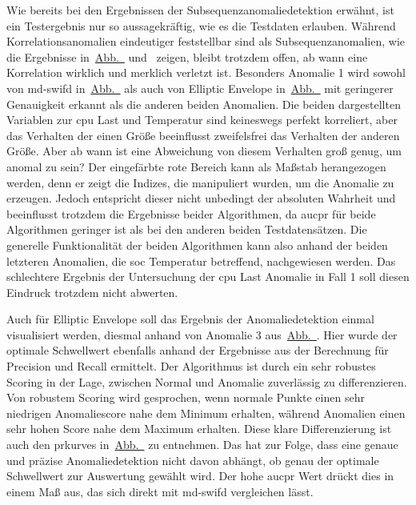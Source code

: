 Wie bereits bei den Ergebnissen der Subsequenzanomaliedetektion erwähnt, ist ein Testergebnis nur so aussagekräftig, wie es die Testdaten erlauben. Während
Korrelationsanomalien eindeutiger feststellbar sind als Subsequenzanomalien, wie die Ergebnisse in~\hyperref[fig:MDSWIFD_AUC_PR]{Abb.~}
und~ zeigen, bleibt trotzdem offen, ab wann eine Korrelation wirklich
und merklich verletzt ist. Besonders Anomalie 1 wird sowohl von \ac{md-swifd} in~\hyperref[fig:MDSWIFD_AUC_PR]{Abb.~} als auch von Elliptic
Envelope in~\hyperref[fig:EE_AUC_PR]{Abb.~} mit geringerer Genauigkeit erkannt als die anderen beiden Anomalien. Die beiden dargestellten
Variablen zur \ac{cpu} Last und Temperatur sind keineswegs perfekt korreliert, aber das Verhalten der einen Größe beeinflusst zweifelsfrei das Verhalten der anderen
Größe. Aber ab wann ist eine Abweichung von diesem Verhalten groß genug, um anomal zu sein? Der eingefärbte rote Bereich kann als Maßstab herangezogen werden, denn er
zeigt die Indizes, die manipuliert wurden, um die Anomalie zu erzeugen. Jedoch entspricht dieser nicht unbedingt der absoluten Wahrheit und beeinflusst trotzdem
die Ergebnisse beider Algorithmen, da \ac{aucpr} für beide Algorithmen geringer ist als bei den anderen beiden Testdatensätzen. Die generelle Funktionalität der beiden
Algorithmen kann also anhand der beiden letzteren Anomalien, die \ac{soc} Temperatur betreffend, nachgewiesen werden. Das schlechtere Ergebnis der Untersuchung der
\ac{cpu} Last Anomalie in Fall 1 soll diesen Eindruck trotzdem nicht abwerten.

Auch für Elliptic Envelope soll das Ergebnis der Anomaliedetektion einmal visualisiert werden, diesmal anhand von Anomalie 3
aus~\hyperref[fig:subsequenz_datensätze]{Abb.~}. Hier wurde der optimale Schwellwert ebenfalls anhand der Ergebnisse aus der Berechnung
für Precision und Recall ermittelt. Der Algorithmus ist durch ein sehr robustes Scoring in der Lage, zwischen Normal und Anomalie zuverlässig zu differenzieren.
Von robustem Scoring wird gesprochen, wenn normale Punkte einen sehr niedrigen Anomaliescore nahe dem Minimum erhalten, während Anomalien einen sehr hohen Score
nahe dem Maximum erhalten. Diese klare Differenzierung ist auch den \acp{prkurve} in~\hyperref[fig:EE_AUC_PR]{Abb.~} zu entnehmen. Das hat zur Folge,
dass eine genaue und präzise Anomaliedetektion nicht davon abhängt, ob genau der optimale Schwellwert zur Auswertung gewählt wird. Der hohe \ac{aucpr} Wert drückt dies
in einem Maß aus, das sich direkt mit \ac{md-swifd} vergleichen lässt.

